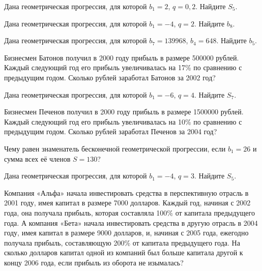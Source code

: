 \documentclass[4apaper]{article}
\begin{document}
\begin{taskBN}{30}
Дана геометрическая прогрессия, для которой $b_1 = 2$, $q=0,2$. Найдите $S_{5}$.
\end{taskBN}

\begin{taskBN}{31}
Дана геометрическая прогрессия, для которой $b_1 = -4$, $q=2$. Найдите $b_{8}$.
\end{taskBN}

\begin{taskBN}{32}
Дана геометрическая прогрессия, для которой $b_{7} = 139968$, $b_{4}=648$. Найдите $b_{5}$.
\end{taskBN}

\begin{taskBN}{33}
Бизнесмен Батонов получил в 2000 году прибыль в размере 500000 рублей. Каждый следующий год его прибыль увеличивалась на 17\% по сравнению с предыдущим годом. Сколько рублей заработал Батонов за 2002 год?
\end{taskBN}

\begin{taskBN}{34}
Дана геометрическая прогрессия, для которой $b_1 = -6$, $q=4$. Найдите $S_{7}$.
\end{taskBN}

\begin{taskBN}{35}
Бизнесмен Печенов получил в 2000 году прибыль в размере 1500000 рублей. Каждый следующий год его прибыль увеличивалась на 10\% по сравнению с предыдущим годом. Сколько рублей заработал Печенов за 2004 год?
\end{taskBN}

\begin{taskBN}{36}
Чему равен знаменатель бесконечной геометрической прогрессии, если $b_1 = 26$ и сумма всех её членов $S=130$?
\end{taskBN}

\begin{taskBN}{37}
Дана геометрическая прогрессия, для которой $b_1 = -4$, $q=3$. Найдите $S_{5}$.
\end{taskBN}

\begin{taskBN}{38}
Компания «Альфа» начала инвестировать средства в перспективную отрасль в 2001 году, имея капитал в размере 7000 долларов. Каждый год, начиная с 2002 года, она получала прибыль, которая составляла 100\% от капитала предыдущего года. А компания «Бета» начала инвестировать средства в другую отрасль в 2004 году, имея капитал в размере 9000 долларов, и, начиная с 2005 года, ежегодно получала прибыль, составляющую 200\% от капитала предыдущего года. На сколько долларов капитал одной из компаний был больше капитала другой к концу 2006 года, если прибыль из оборота не изымалась?
\end{taskBN}
\end{document}
